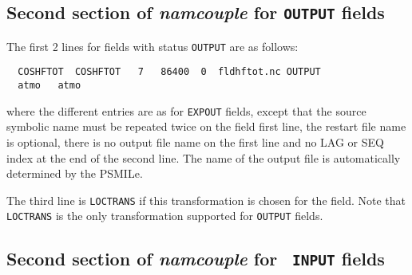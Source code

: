 %
%

\subsection{Second section of {\it namcouple} for {\tt OUTPUT} fields}
\label{subsubsec_secondOUTPUT}
  The first 2 lines for fields with status {\tt OUTPUT} are as follows:
  \begin{verbatim}
  COSHFTOT  COSHFTOT   7   86400  0  fldhftot.nc OUTPUT 
  atmo   atmo \end{verbatim}
where the different entries are as for {\tt EXPOUT} fields, except
that the source symbolic name must be repeated twice on the field
first line, the restart file name is optional, there is no output file
name on the first line and no LAG or  SEQ index at the end of the second line.
The name of the output file is automatically determined by the PSMILe.

The third line is {\tt LOCTRANS} if this transformation is chosen for
the field. Note that {\tt LOCTRANS} is the only transformation
supported for {\tt OUTPUT} fields.

\subsection{Second section of {\it namcouple} for {\tt
  INPUT} fields}
\label{subsubsec_secondINPUT}

